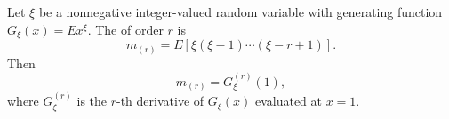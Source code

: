 Let $\xi$ be a nonnegative integer-valued random variable with generating function $G_\xi(x) = E x^\xi$. The  of order $r$ is
$$m_{(r)} = E[\xi(\xi-1) \cdots (\xi-r+1)].$$
Then
$$m_{(r)} = G_\xi^{(r)}(1),$$
where $G_\xi^{(r)}$ is the $r$-th derivative of $G_\xi(x)$ evaluated at $x = 1$.
